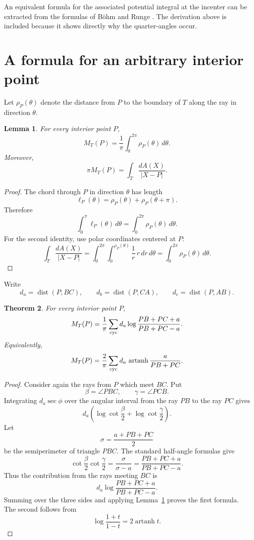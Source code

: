 \documentclass[11pt]{article}
\newtheorem{theorem}{Theorem}[section]
\newtheorem{lemma}[theorem]{Lemma}
\theoremstyle{remark}
\begin{document}
An equivalent formula for the associated potential integral at the
incenter can be extracted from the formulas of B\"ohm and Runge
\cite{BohmRunge}.  The derivation above is included because it shows
directly why the quarter-angles occur.

\section{A formula for an arbitrary interior point}

Let $\rho_P(\theta)$ denote the distance from $P$ to the boundary of
$T$ along the ray in direction $\theta$.

\begin{lemma}\label{lem:radial}
For every interior point $P$,
\[
 {
 M_T(P)=\frac1\pi\int_0^{2\pi}\rho_P(\theta)\,d\theta.
 }
\]
Moreover,
\[
 {
 \pi M_T(P)=
 \int_T\frac{dA(X)}{|X-P|}.
 }
\]
\end{lemma}

\begin{proof}
The chord through $P$ in direction $\theta$ has length
\[
 \ell_P(\theta)=\rho_P(\theta)+\rho_P(\theta+\pi).
\]
Therefore
\[
 \int_0^\pi\ell_P(\theta)\,d\theta
 =
 \int_0^{2\pi}\rho_P(\theta)\,d\theta.
\]
For the second identity, use polar coordinates centered at $P$:
\[
 \int_T\frac{dA(X)}{|X-P|}
 =
 \int_0^{2\pi}\int_0^{\rho_P(\theta)}
 \frac1r\,r\,dr\,d\theta
 =
 \int_0^{2\pi}\rho_P(\theta)\,d\theta.
\]
\end{proof}

Write
\[
 d_a=\operatorname{dist}(P,BC),\qquad
 d_b=\operatorname{dist}(P,CA),\qquad
 d_c=\operatorname{dist}(P,AB).
\]

\begin{theorem}\label{thm:general}
For every interior point $P$,
\[
 {
 M_T(P)=\frac1\pi\sum_{\rm cyc}
 d_a\log\frac{PB+PC+a}{PB+PC-a}.
 }
\]
Equivalently,
\[
 M_T(P)=\frac{2}{\pi}\sum_{\rm cyc}
 d_a\,\operatorname{artanh}\frac{a}{PB+PC}.
\]
\end{theorem}

\begin{proof}
Consider again the rays from $P$ which meet $BC$.  Put
\[
 \beta=\angle PBC,\qquad \gamma=\angle PCB.
\]
Integrating $d_a\sec\phi$ over the angular interval from the ray $PB$
to the ray $PC$ gives
\[
 d_a\left(\log\cot\frac{\beta}{2}
          +\log\cot\frac{\gamma}{2}\right).
\]
Let
\[
 \sigma=\frac{a+PB+PC}{2}
\]
be the semiperimeter of triangle $PBC$.  The standard half-angle
formulas give
\[
 \cot\frac{\beta}{2}\cot\frac{\gamma}{2}
 =
 \frac{\sigma}{\sigma-a}
 =
 \frac{PB+PC+a}{PB+PC-a}.
\]
Thus the contribution from the rays meeting $BC$ is
\[
 d_a\log\frac{PB+PC+a}{PB+PC-a}.
\]
Summing over the three sides and applying Lemma~\ref{lem:radial}
proves the first formula.  The second follows from
\[
 \log\frac{1+t}{1-t}=2\operatorname{artanh}t.
\]
\end{proof}
\end{document}
